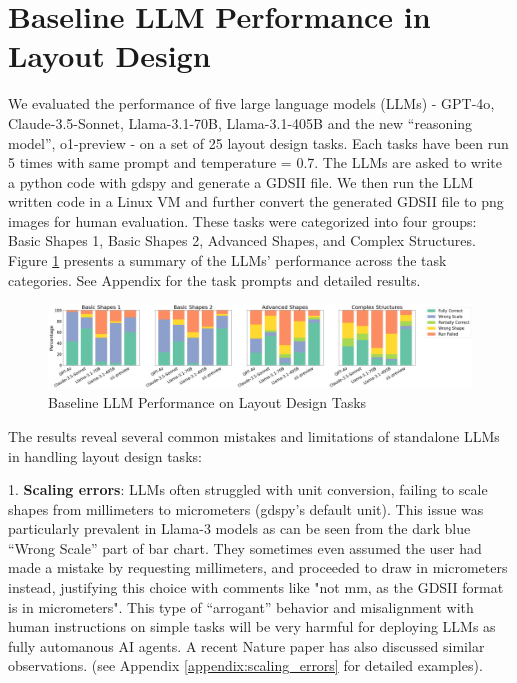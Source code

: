 \documentclass{article}
\begin{document}
\section{Baseline LLM Performance in Layout Design}

We evaluated the performance of five large language models (LLMs) - GPT-4o\cite{GPT-4o}, Claude-3.5-Sonnet\cite{Claude-3.5-Sonnet}, Llama-3.1-70B\cite{Llama-3.1-70B}, Llama-3.1-405B\cite{Llama-3.1-405B} and the new ``reasoning model'', o1-preview\cite{o1-preview} - on a set of 25 layout design tasks. Each tasks have been run 5 times with same prompt and temperature = 0.7. The LLMs are asked to write a python code with gdspy\cite{gdspy} and generate a GDSII file. We then run the LLM written code in a Linux VM and further convert the generated GDSII file to png images for human evaluation. These tasks were categorized into four groups: Basic Shapes 1, Basic Shapes 2, Advanced Shapes, and Complex Structures. Figure \ref{fig:baseline-llm-performance} presents a summary of the LLMs' performance across the task categories. See Appendix for the task prompts and detailed results.

\begin{figure}[h]
  \centering
  \includegraphics[width=\textwidth]{baseline-llm-performance.png}
  \caption{Baseline LLM Performance on Layout Design Tasks}
  \label{fig:baseline-llm-performance}
\end{figure}

The results reveal several common mistakes and limitations of standalone LLMs in handling layout design tasks:

1. \textbf{Scaling errors}: LLMs often struggled with unit conversion, failing to scale shapes from millimeters to micrometers (gdspy's default unit). This issue was particularly prevalent in Llama-3 models as can be seen from the dark blue ``Wrong Scale'' part of bar chart. They sometimes even assumed the user had made a mistake by requesting millimeters, and proceeded to 
draw in micrometers instead, justifying this choice 
with comments like "not mm, as the GDSII format is in 
micrometers". This type of ``arrogant'' behavior and 
misalignment with human instructions on simple tasks 
will be very harmful for deploying LLMs as fully 
automanous AI agents. A recent Nature paper \cite
{ZhouNature2024} has also discussed similar 
observations. (see Appendix \ref{appendix:scaling_errors} for detailed examples).
\end{document}
